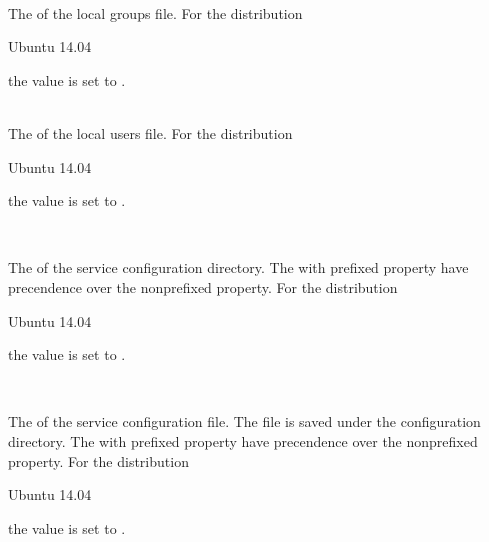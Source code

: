 \\

The  of the local groups file.
For the distribution
\begin{inparaitem}
\item[\TheDistribution{ubuntu}] Ubuntu 14.04
\end{inparaitem}
the value is set to .

\\

The  of the local users file.
For the distribution
\begin{inparaitem}
\item[\TheDistribution{ubuntu}] Ubuntu 14.04
\end{inparaitem}
the value is set to .

\\

The  of the service configuration directory.
The with  prefixed property have precendence over the 
nonprefixed property.
For the distribution
\begin{inparaitem}
\item[\TheDistribution{ubuntu}] Ubuntu 14.04
\end{inparaitem}
the value is set to .

\\

The  of the service configuration file. The file is saved
under the configuration directory. The with  prefixed 
property have precendence over the nonprefixed property.
For the distribution
\begin{inparaitem}
\item[\TheDistribution{ubuntu}] Ubuntu 14.04
\end{inparaitem}
the value is set to .

